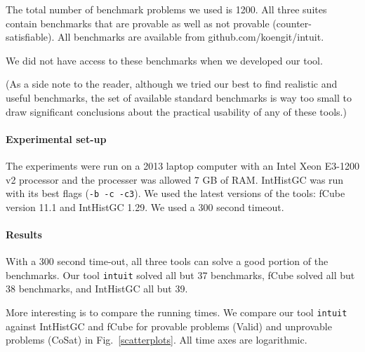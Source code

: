 \documentclass{llncs}
\begin{document}
The total number of benchmark problems we used is 1200. All three suites contain benchmarks that are provable as well as not provable (counter-satisfiable). All benchmarks are available from {\sf github.com/koengit/intuit}.

We did not have access to these benchmarks when we developed our tool.

(As a side note to the reader, although we tried our best to find realistic and useful benchmarks, the set of available standard benchmarks is way too small to draw significant conclusions about the practical usability of any of these tools.)

\paragraph{Experimental set-up} The experiments were run on a 2013 laptop computer
with an Intel Xeon E3-1200 v2 processor and the processer was allowed 7 GB of RAM.
IntHistGC was run with its best flags ({\tt -b -c -c3}). We used the latest versions of the tools: fCube version 11.1 and IntHistGC 1.29. We used a 300 second timeout.

\paragraph{Results} With a 300 second time-out, all three tools can solve a good portion of the benchmarks. Our tool {\tt intuit} solved all but 37 benchmarks, fCube solved all but 38 benchmarks, and IntHistGC all but 39.






More interesting is to compare the running times. We compare our tool {\tt intuit} against IntHistGC and fCube for provable problems (Valid) and unprovable problems (CoSat) in Fig.\ \ref{scatterplots}. All time axes are logarithmic. 
\end{document}
